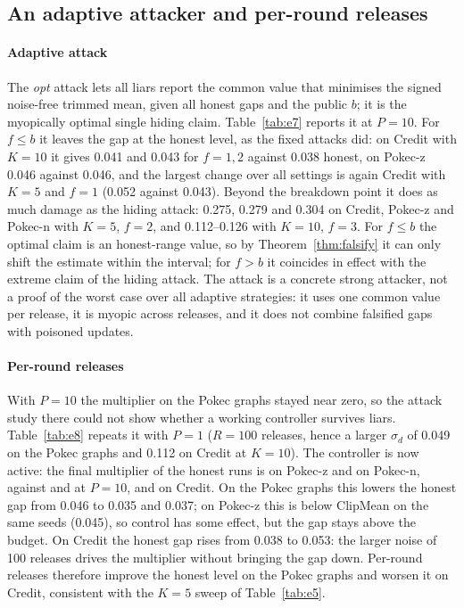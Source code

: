 \subsection{An adaptive attacker and per-round releases}\label{sec:adaptive}




\paragraph{Adaptive attack}
The \emph{opt} attack lets all liars report the common value that minimises the signed noise-free trimmed mean, given all honest gaps and the public $b$; it is the myopically optimal single hiding claim. Table~\ref{tab:e7} reports it at $P=10$. For $f\le b$ it leaves the gap at the honest level, as the fixed attacks did: on Credit with $K=10$ it gives 0.041 and 0.043 for $f=1,2$ against 0.038 honest, on Pokec-z 0.046 against 0.046, and the largest change over all settings is again Credit with $K=5$ and $f=1$ (0.052 against 0.043). Beyond the breakdown point it does as much damage as the hiding attack: 0.275, 0.279 and 0.304 on Credit, Pokec-z and Pokec-n with $K=5$, $f=2$, and 0.112--0.126 with $K=10$, $f=3$. For $f\le b$ the optimal claim is an honest-range value, so by Theorem~\ref{thm:falsify} it can only shift the estimate within the interval; for $f>b$ it coincides in effect with the extreme claim of the hiding attack. The attack is a concrete strong attacker, not a proof of the worst case over all adaptive strategies: it uses one common value per release, it is myopic across releases, and it does not combine falsified gaps with poisoned updates.

\paragraph{Per-round releases}
With $P=10$ the multiplier on the Pokec graphs stayed near zero, so the attack study there could not show whether a working controller survives liars. Table~\ref{tab:e8} repeats it with $P=1$ ($R=100$ releases, hence a larger $\sigma_d$ of 0.049 on the Pokec graphs and 0.112 on Credit at $K=10$). The controller is now active: the final multiplier of the honest runs is \eEightPokeczLam{} on Pokec-z and \eEightPokecnLam{} on Pokec-n, against \eEightPtenPokeczLam{} and \eEightPtenPokecnLam{} at $P=10$, and \eEightCreditLam{} on Credit. On the Pokec graphs this lowers the honest gap from 0.046 to 0.035 and 0.037; on Pokec-z this is below ClipMean on the same seeds (0.045), so control has some effect, but the gap stays above the budget. On Credit the honest gap rises from 0.038 to 0.053: the larger noise of 100 releases drives the multiplier without bringing the gap down. Per-round releases therefore improve the honest level on the Pokec graphs and worsen it on Credit, consistent with the $K=5$ sweep of Table~\ref{tab:e5}.

